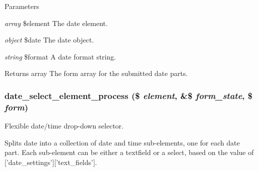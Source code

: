 \begin{DoxyParams}{Parameters}
\item[{\em array}]\$element The date element. \item[{\em object}]\$date The date object. \item[{\em string}]\$format A date format string.\end{DoxyParams}
\begin{DoxyReturn}{Returns}
array The form array for the submitted date parts. 
\end{DoxyReturn}
\hypertarget{date__api__elements_8inc_adabdb1eea05a7d11cb2108a18f01aeed}{
\subsubsection[{date\_\-select\_\-element\_\-process}]{\setlength{\rightskip}{0pt plus 5cm}date\_\-select\_\-element\_\-process (\$ {\em element}, \/  \&\$ {\em form\_\-state}, \/  \$ {\em form})}}
\label{date__api__elements_8inc_adabdb1eea05a7d11cb2108a18f01aeed}
Flexible date/time drop-\/down selector.

Splits date into a collection of date and time sub-\/elements, one for each date part. Each sub-\/element can be either a textfield or a select, based on the value of \mbox{[}'date\_\-settings'\mbox{]}\mbox{[}'text\_\-fields'\mbox{]}.

